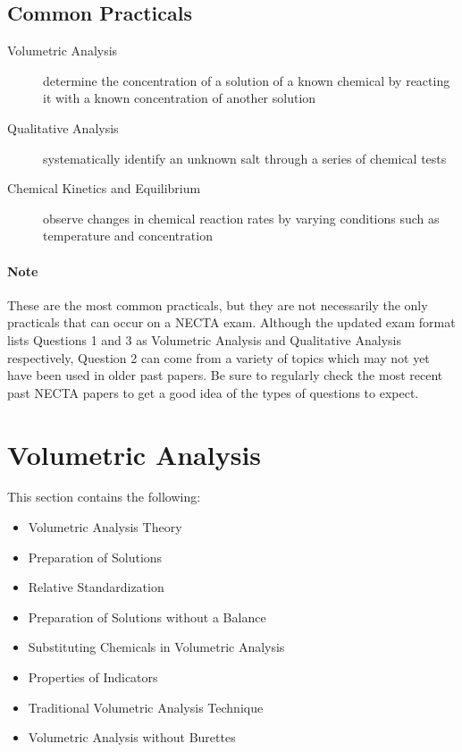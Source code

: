 \subsection{Common Practicals}
\begin{description}
\item[Volumetric Analysis]{determine the concentration of a solution of a known chemical by reacting it with a known concentration of another solution}
\item[Qualitative Analysis]{systematically identify an unknown salt through a series of chemical tests}
\item[Chemical Kinetics and Equilibrium]{observe changes in chemical reaction rates by varying conditions such as temperature and concentration}
\end{description}

\paragraph{Note} These are the most common practicals, but they are not necessarily the only practicals that can occur on a NECTA exam. Although the updated exam format lists Questions 1 and 3 as Volumetric Analysis and Qualitative Analysis respectively, Question 2 can come from a variety of topics which may not yet have been used in older past papers. Be sure to regularly check the most recent past NECTA papers to get a good idea of the types of questions to expect. 


\section{Volumetric Analysis}

This section contains the following:
\begin{itemize}
\item Volumetric Analysis Theory
\item Preparation of Solutions
\item Relative Standardization
\item Preparation of Solutions without a Balance
\item Substituting Chemicals in Volumetric Analysis
\item Properties of Indicators
\item Traditional Volumetric Analysis Technique
\item Volumetric Analysis without Burettes
\end{itemize}

